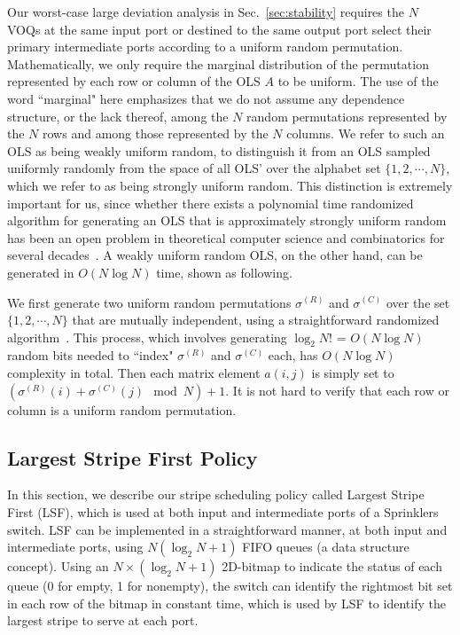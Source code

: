 Our worst-case large deviation analysis in Sec.~\ref{sec:stability} requires the $N$ VOQs at the same input port or 
destined to the same output port
select their primary intermediate ports according to a uniform random permutation.
Mathematically, we only require the marginal distribution of the permutation represented by each row or column 
of the 
OLS
$A$ to be uniform.  
The use of the word ``marginal" here emphasizes that
we do not assume any dependence structure, or the lack thereof, among the $N$ random permutations 
represented by the $N$ rows and among those represented by the $N$ columns.  We refer to such an OLS as being weakly uniform random, to 
distinguish it from an OLS sampled uniformly randomly from the space of all
OLS' over the alphabet set $\{1, 2, \cdots, N\}$, which we refer to as being strongly uniform random.  
This distinction is extremely important for us, since  
whether there exists a polynomial time randomized algorithm for generating an OLS that is approximately strongly
uniform random has been an open problem in theoretical computer science and combinatorics 
for several decades~\cite{drizen2012generating,jacobson1996generating}.
A weakly uniform random OLS,
on the other hand, can be generated in $O(N \log N)$ time, shown as following.

We first generate two 
uniform random permutations $\sigma^{(R)}$
and $\sigma^{(C)}$ over the set $\{1, 2, \cdots, N\}$ that are mutually independent,
using a straightforward randomized algorithm~\cite{durstenfeld1964algorithm}.  
This process, which involves generating
$\log_2 N!$ = $O(N \log N)$ random bits needed to ``index" 
$\sigma^{(R)}$ and $\sigma^{(C)}$ each,  has $O(N \log N)$ complexity in total.  Then each matrix 
element $a(i, j)$ is simply set to $(\sigma^{(R)}(i) + \sigma^{(C)}(j) \mod N) + 1$.   It is not hard 
to verify that each row or column is a uniform random permutation.







\subsection{Largest Stripe First Policy}
\label{sec: lsf scheduling}







In this section, we describe our stripe scheduling policy called Largest Stripe First (LSF), which is used at both
input and intermediate ports of a Sprinklers switch.  LSF can be implemented in a straightforward
manner, at both input and intermediate ports, using $N (\log_2 N + 1)$ FIFO queues (a data structure concept).
Using an $N \times (\log_2 N + 1)$ 2D-bitmap to indicate the status of each queue (0 for empty, 1 for nonempty),
the switch can identify the rightmost bit set in each row of the bitmap in constant time,
which is used by LSF to identify the largest stripe to serve at each port.


